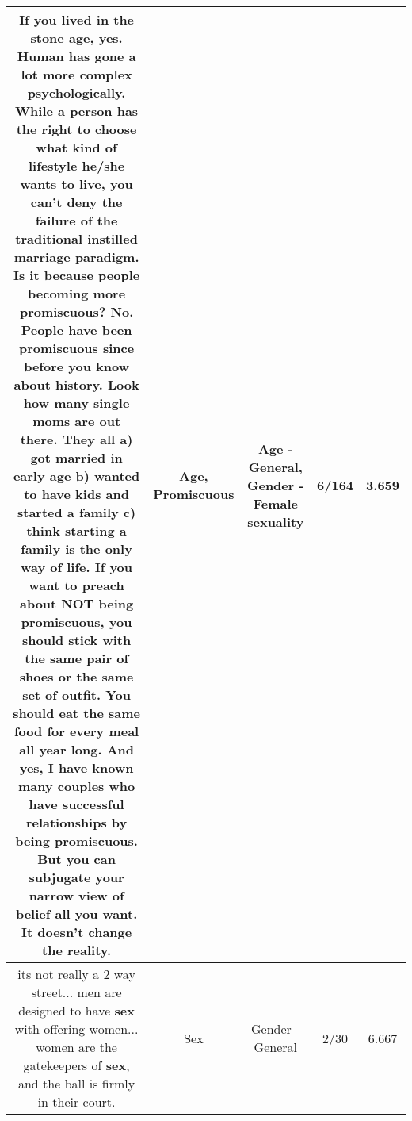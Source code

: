 \documentclass[11pt]{article}
\newlength\mylength
\begin{document}
\begin{center}
\begin{longtable}{|C{.65\mylength}|C{.30\mylength}|C{.12\mylength}|C{.12\mylength}|C{.12\mylength}|}
  \small If you lived in the stone \textbf{age}, yes. Human has gone a lot more complex psychologically. While a person has the right to choose what kind of lifestyle he/she wants to live, you can't deny the failure of the traditional instilled marriage paradigm. Is it because people becoming more \textbf{promiscuous}? No. People have been \textbf{promiscuous} since before you know about history. Look how many single moms are out there. They all a) got married in early \textbf{age}  b) wanted to have kids and started a family  c) think starting a family is the only way of life.   If you want to preach about NOT being \textbf{promiscuous}, you should stick with the same pair of shoes or the same set of outfit. You should eat the same food for every meal all year long. And yes, I have known many couples who have successful relationships by being \textbf{promiscuous}. But you can subjugate your narrow view of belief all you want. It doesn't change the reality.\normalsize   & Age, Promiscuous & Age - General, Gender - Female sexuality & 6/164 & 3.659 \\  \hline
  \small its not really a 2 way street... men are designed to have \textbf{sex} with offering women... women are the gatekeepers of \textbf{sex}, and the ball is firmly in their court.\normalsize   & Sex & Gender - General & 2/30 & 6.667 \\  \hline

\end{longtable}
\end{center}
\end{document}
